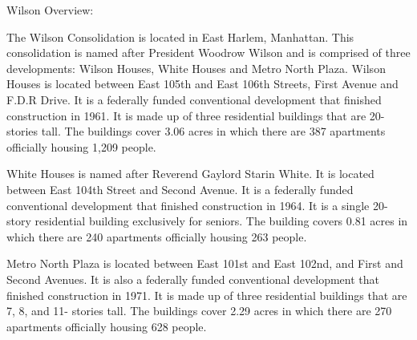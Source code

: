 Wilson Overview:     

   

The Wilson Consolidation is located in East Harlem, Manhattan. This consolidation is named after President Woodrow Wilson and is comprised of three developments: Wilson Houses, White Houses and Metro North Plaza. Wilson Houses is located between East 105th and East 106th Streets, First Avenue and F.D.R Drive. It is a federally funded conventional development that finished construction in 1961. It is made up of three residential buildings that are 20- stories tall. The buildings cover 3.06 acres in which there are 387 apartments officially housing 1,209 people. 



White Houses is named after Reverend Gaylord Starin White. It is located between East 104th Street and Second Avenue. It is a federally funded conventional development that finished construction in 1964. It is a single 20- story residential building exclusively for seniors. The building covers 0.81 acres in which there are 240 apartments officially housing 263 people. 



Metro North Plaza is located between East 101st and East 102nd, and First and Second Avenues. It is also a federally funded conventional development that finished construction in 1971. It is made up of three residential buildings that are 7, 8, and 11- stories tall. The buildings cover 2.29 acres in which there are 270  apartments officially housing 628  people.
